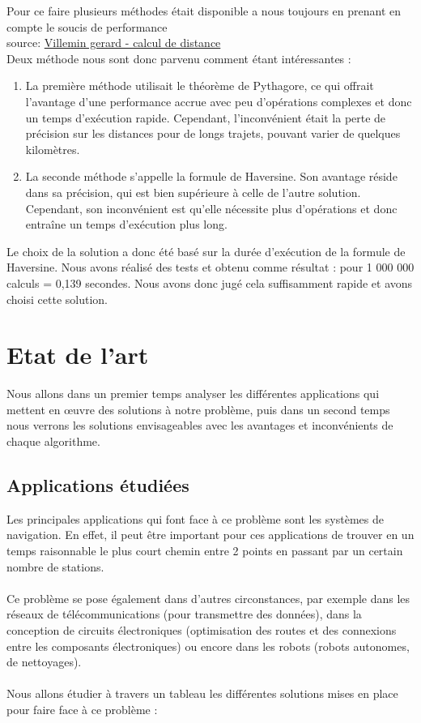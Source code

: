 \documentclass[12pt,titlepage]{report}
\begin{document}
Pour ce faire plusieurs méthodes était disponible a nous toujours en prenant en compte le soucis de performance \\ 
source: \href{http://villemin.gerard.free.fr/aGeograp/Distance.htm}{Villemin gerard - calcul de distance} \\
Deux méthode nous sont donc parvenu comment étant intéressantes : \\
\begin{enumerate}
    \item La première méthode utilisait le théorème de Pythagore, ce qui offrait l'avantage d'une performance accrue avec peu d'opérations complexes et donc un temps d'exécution rapide. Cependant, l'inconvénient était la perte de précision sur les distances pour de longs trajets, pouvant varier de quelques kilomètres.
    \item La seconde méthode s'appelle la formule de Haversine. Son avantage réside dans sa précision, qui est bien supérieure à celle de l'autre solution. Cependant, son inconvénient est qu'elle nécessite plus d'opérations et donc entraîne un temps d'exécution plus long.
\end{enumerate}
Le choix de la solution a donc été basé sur la durée d'exécution de la formule de Haversine. Nous avons réalisé des tests et obtenu comme résultat : pour 1 000 000 calculs = 0,139 secondes. Nous avons donc jugé cela suffisamment rapide et avons choisi cette solution.



\section{Etat de l'art}
Nous allons dans un premier temps analyser les différentes applications qui mettent en œuvre des solutions à notre problème, puis dans un second temps nous verrons les solutions envisageables avec les avantages et inconvénients de chaque algorithme.

\subsection{Applications étudiées}
Les principales applications qui font face à ce problème sont les systèmes de navigation. En effet, il peut être important pour ces applications de trouver en un temps raisonnable le plus court chemin entre 2 points en passant par un certain nombre de stations.\\
\\
Ce problème se pose également dans d’autres circonstances, par exemple dans les réseaux de télécommunications (pour transmettre des données), dans la conception de circuits électroniques (optimisation des routes et des connexions entre les composants électroniques) ou encore dans les robots (robots autonomes, de nettoyages).\\
\\
Nous allons étudier à travers un tableau les différentes solutions mises en place pour faire face à ce problème :
\end{document}
